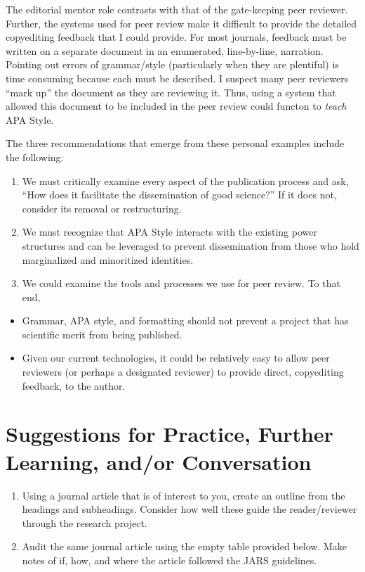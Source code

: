 \documentclass[
  11pt,
]{book}
\providecommand{\tightlist}{%
  \setlength{\itemsep}{0pt}\setlength{\parskip}{0pt}}
\begin{document}
The editorial mentor role contrasts with that of the gate-keeping peer reviewer. Further, the systems used for peer review make it difficult to provide the detailed copyediting feedback that I could provide. For most journals, feedback must be written on a separate document in an enumerated, line-by-line, narration. Pointing out errors of grammar/style (particularly when they are plentiful) is time consuming because each must be described. I suspect many peer reviewers ``mark up'' the document as they are reviewing it. Thus, using a system that allowed this document to be included in the peer review could functon to \emph{teach} APA Style.

The three recommendations that emerge from these personal examples include the following:

\begin{enumerate}
\def\labelenumi{\arabic{enumi}.}
\tightlist
\item
  We must critically examine every aspect of the publication process and ask, ``How does it facilitate the dissemination of good science?'' If it does not, consider its removal or restructuring.
\item
  We must recognize that APA Style interacts with the existing power structures and can be leveraged to prevent dissemination from those who hold marginalized and minoritized identities.
\item
  We could examine the tools and processes we use for peer review. To that end,
\end{enumerate}

\begin{itemize}
\tightlist
\item
  Grammar, APA style, and formatting should not prevent a project that has scientific merit from being published.
\item
  Given our current technologies, it could be relatively easy to allow peer reviewers (or perhaps a designated reviewer) to provide direct, copyediting feedback, to the author.
\end{itemize}

\section{Suggestions for Practice, Further Learning, and/or Conversation}\label{suggestions-for-practice-further-learning-andor-conversation-4}

\begin{enumerate}
\def\labelenumi{\arabic{enumi}.}
\tightlist
\item
  Using a journal article that is of interest to you, create an outline from the headings and subheadings. Consider how well these guide the reader/reviewer through the research project.
\item
  Audit the same journal article using the empty table provided below. Make notes of if, how, and where the article followed the JARS guidelines.
\end{enumerate}
\end{document}
